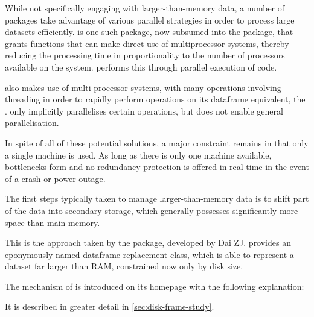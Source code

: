 While not specifically engaging with larger-than-memory data, a number of packages take advantage of various parallel strategies in order to process large datasets efficiently.
 is one such package, now subsumed into the  package, that grants functions that can make direct use of multiprocessor systems, thereby reducing the processing time in proportionality to the number of processors available on the system.
 performs this through parallel execution of \R{} code.

 also makes use of multi-processor systems, with many operations involving threading in order to rapidly perform operations on its dataframe equivalent, the .
 only implicitly parallelises certain operations, but does not enable general parallelisation.

In spite of all of these potential solutions, a major constraint remains in that only a single machine is used.
As long as there is only one machine available, bottlenecks form and no redundancy protection is offered in real-time in the event of a crash or power outage.

The first steps typically taken to manage larger-than-memory data is to shift part of the data into secondary storage, which generally possesses significantly more space than main memory.

This is the approach taken by the  package, developed by Dai ZJ.
 provides an eponymously named dataframe
replacement class, which is able to represent a dataset far larger than
RAM, constrained now only by disk size\cite{zj20}.

The mechanism of  is introduced on its homepage with the following explanation:


It is described in greater detail in \cref{sec:disk-frame-study}.
